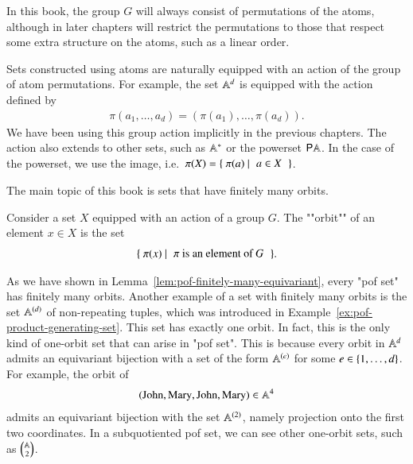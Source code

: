 In this book, the group $G$ will always consist of  permutations of the atoms, although in later chapters will restrict the permutations to those that respect some extra structure on the atoms, such as a linear order.

\begin{myexample}
    Sets constructed using atoms are naturally equipped with an action  of the group of atom permutations. For example, the set $\mathbb A^d$ is equipped with the action defined by 
    \begin{align*}
    \pi(a_1,\ldots,a_d) = (\pi(a_1),\ldots,\pi(a_d)).
    \end{align*}
    We have been using this group action implicitly in the previous chapters. The action also extends to other sets, such as $\mathbb A^*$ or the powerset ${\mathsf P} \mathbb A$. In the case of the powerset, we use the image, i.e.~$
    \pi(X) = \setbuild{\pi(a)}{$a \in X$}$.
\end{myexample}

The main topic of this book is sets that have finitely many orbits.

\begin{definition}[Orbit]\label{def:orbit}
    Consider a set $X$ equipped with an action of a group $G$. The  ""orbit"" of an element $x \in X$ is the set 
    \begin{align*}
        \setbuild{ \pi(x)}{$\pi$ is an element of $G$}.
    \end{align*}
\end{definition}

\begin{myexample}
    \label{ex:finite-constructions-of-of-sets}
     As we have shown in Lemma~\ref{lem:pof-finitely-many-equivariant}, every "pof set" has finitely many orbits. Another example of a set with finitely many orbits is the set $\mathbb A^{(d)}$ of non-repeating tuples, which was introduced in Example~\ref{ex:pof-product-generating-set}. This set has exactly one orbit. In fact, this is the only kind of one-orbit set that can arise in "pof set". This is because  every orbit in $\mathbb A^d$ admits an equivariant bijection with a set of the form $\mathbb A^{(e)}$ for some $e \in \{1,\ldots,d\}$. For example, the orbit of 
    \begin{align*}
    (\text{John},\text{Mary},\text{John},\text{Mary}) \in \mathbb A^4
    \end{align*}
admits an equivariant bijection with the set $\mathbb A^{(2)}$, namely projection onto the first two coordinates. In a subquotiented pof set, we can see other one-orbit sets, such as $\mathbb A \choose 2$. 
\end{myexample}

